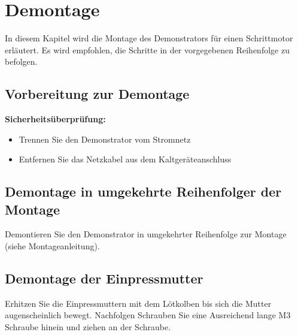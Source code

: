 %

\chapter{Demontage}
In diesem Kapitel wird die Montage des Demonstrators für einen Schrittmotor erläutert. Es wird empfohlen, die Schritte in der vorgegebenen Reihenfolge zu befolgen.


\section{ Vorbereitung zur Demontage}

\textbf{Sicherheitsüberprüfung:}\begin{itemize}
		\item Trennen Sie den Demonstrator vom Stromnetz 
		\item Entfernen Sie das Netzkabel aus dem Kaltgeräteanschluss
	\end{itemize}

\section{ Demontage in umgekehrte Reihenfolger der Montage}

Demontieren Sie den Demonstrator in umgekehrter Reihenfolge zur Montage (siehe Montageanleitung).

\section{ Demontage der Einpressmutter}
Erhitzen Sie die Einpressmuttern mit dem Lötkolben bis sich die Mutter augenscheinlich bewegt. Nachfolgen Schrauben Sie eine Ausreichend lange M3 Schraube hinein und ziehen an der Schraube.


